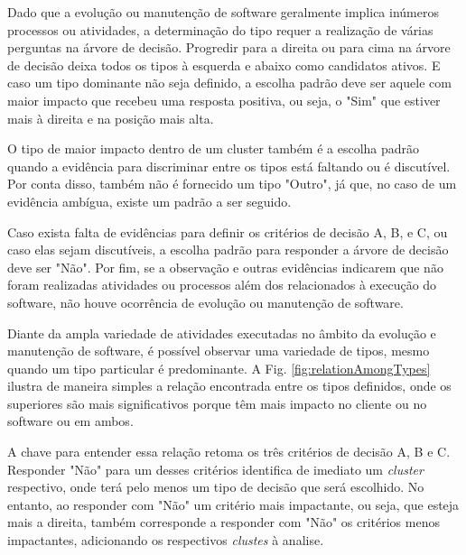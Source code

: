 Dado que a evolução ou manutenção de software geralmente implica inúmeros processos ou atividades, a 
determinação do tipo requer a realização de várias perguntas na árvore de decisão. Progredir para a 
direita ou para cima na árvore de decisão deixa todos os tipos à esquerda e abaixo como candidatos ativos. 
E caso um tipo dominante não seja definido, a escolha padrão deve ser aquele com maior impacto que 
recebeu uma resposta positiva, ou seja, o "Sim" que estiver mais à direita e na posição mais alta.

O tipo de maior impacto dentro de um cluster também é a escolha padrão quando a evidência para 
discriminar entre os tipos está faltando ou é discutível. Por conta disso, também não é fornecido 
um tipo "Outro", já que, no caso de um evidência ambígua, existe um padrão a ser seguido.

Caso exista falta de evidências para definir os critérios de decisão A, B, e C, ou caso elas sejam 
discutíveis, a escolha padrão para responder a árvore de decisão deve ser "Não". Por fim, se a 
observação e outras evidências indicarem que não foram realizadas atividades ou processos além 
dos relacionados à execução do software, não houve ocorrência de evolução ou manutenção de software.


Diante da ampla variedade de atividades executadas no âmbito da evolução e manutenção de software, 
é possível observar uma variedade de tipos, mesmo quando um tipo particular é predominante. A Fig. \ref{fig:relationAmongTypes} 
ilustra de maneira simples a relação encontrada entre os tipos definidos, onde os superiores são mais 
significativos porque têm mais impacto no cliente ou no software ou em ambos.

A chave para entender essa relação retoma os três critérios de decisão A, B e C. Responder 
"Não" para um desses critérios identifica de imediato um \textit{cluster} respectivo, onde terá 
pelo menos um tipo de decisão que será escolhido. No entanto, ao responder com "Não" um critério 
mais impactante, ou seja, que esteja mais a direita, também corresponde a responder com "Não" os 
critérios menos impactantes, adicionando os respectivos \textit{clustes} à analise. 

